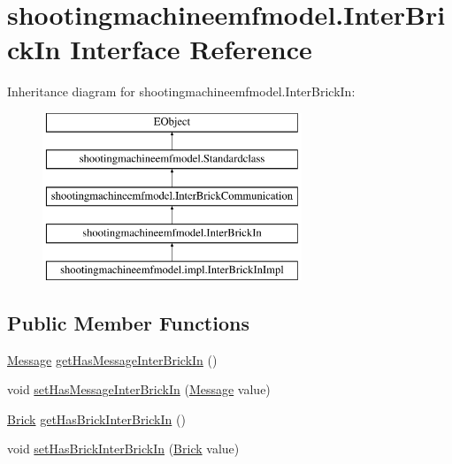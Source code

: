 \hypertarget{interfaceshootingmachineemfmodel_1_1_inter_brick_in}{\section{shootingmachineemfmodel.\-Inter\-Brick\-In Interface Reference}
\label{interfaceshootingmachineemfmodel_1_1_inter_brick_in}
}
Inheritance diagram for shootingmachineemfmodel.\-Inter\-Brick\-In\-:\begin{figure}[H]
\begin{center}
\leavevmode
\includegraphics[height=5.000000cm]{interfaceshootingmachineemfmodel_1_1_inter_brick_in}
\end{center}
\end{figure}
\subsection*{Public Member Functions}
\begin{DoxyCompactItemize}
\item 
\hyperlink{interfaceshootingmachineemfmodel_1_1_message}{Message} \hyperlink{interfaceshootingmachineemfmodel_1_1_inter_brick_in_af2b5b191e72cef222844fe983ade5630}{get\-Has\-Message\-Inter\-Brick\-In} ()
\item 
void \hyperlink{interfaceshootingmachineemfmodel_1_1_inter_brick_in_a6f334b3021e5eeef585e8e23f9d4b3ca}{set\-Has\-Message\-Inter\-Brick\-In} (\hyperlink{interfaceshootingmachineemfmodel_1_1_message}{Message} value)
\item 
\hyperlink{interfaceshootingmachineemfmodel_1_1_brick}{Brick} \hyperlink{interfaceshootingmachineemfmodel_1_1_inter_brick_in_a29cb1ab4bb0366d57ac30808a2753044}{get\-Has\-Brick\-Inter\-Brick\-In} ()
\item 
void \hyperlink{interfaceshootingmachineemfmodel_1_1_inter_brick_in_ab98c9fb4d5f24ffa7c515844af52838f}{set\-Has\-Brick\-Inter\-Brick\-In} (\hyperlink{interfaceshootingmachineemfmodel_1_1_brick}{Brick} value)
\end{DoxyCompactItemize}


